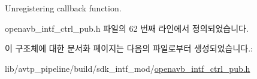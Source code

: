 Unregistering callback function. 



openavb\+\_\+intf\+\_\+ctrl\+\_\+pub.\+h 파일의 62 번째 라인에서 정의되었습니다.



이 구조체에 대한 문서화 페이지는 다음의 파일로부터 생성되었습니다.\+:\begin{DoxyCompactItemize}
\item 
lib/avtp\+\_\+pipeline/build/sdk\+\_\+intf\+\_\+mod/\hyperlink{build_2sdk__intf__mod_2openavb__intf__ctrl__pub_8h}{openavb\+\_\+intf\+\_\+ctrl\+\_\+pub.\+h}\end{DoxyCompactItemize}
